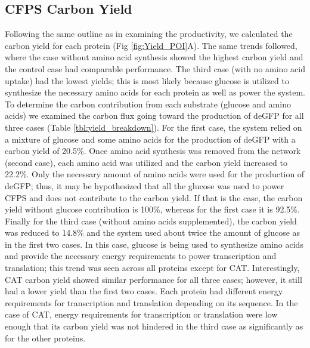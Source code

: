 \documentclass[journal=asbcd6,manuscript=article]{achemso}
\begin{document}
\subsection{CFPS Carbon Yield}
Following the same outline as in examining the productivity, we calculated the carbon yield for each protein (Fig \ref{fig:Yield_POI}A).
The same trends followed, where the case without amino acid synthesis showed the highest carbon yield and the control case had comparable performance.
The third case (with no amino acid uptake) had the lowest yields; this is most likely because glucose is utilized to synthesize the necessary amino acids for each protein as well as power the system. 
To determine the carbon contribution from each substrate (glucose and amino acids) we examined the carbon flux going toward the production of deGFP for all three cases (Table \ref{tbl:yield_breakdown}).
For the first case, the system relied on a mixture of glucose and some amino acids for the production of deGFP with a carbon yield of 20.5\%.
Once amino acid synthesis was removed from the network (second case), each amino acid was utilized and the carbon yield increased to 22.2\%.
Only the necessary amount of amino acids were used for the production of deGFP; thus, it may be hypothesized that all the glucose was used to power CFPS and does not contribute to the carbon yield.
If that is the case, the carbon yield without glucose contribution is 100\%, whereas for the first case it is 92.5\%.
Finally for the third case (without amino acids supplemented), the carbon yield was reduced to 14.8\% and the system used about twice the amount of glucose as in the first two cases.
In this case, glucose is being used to synthesize amino acids and provide the necessary energy requirements to power transcription and translation; this trend was seen across all proteins except for CAT.
Interestingly, CAT carbon yield showed similar performance for all three cases; however, it still had a lower yield than the first two cases.
Each protein had different energy requirements for transcription and translation depending on its sequence.
In the case of CAT, energy requirements for transcription or translation were low enough that its carbon yield was not hindered in the third case as significantly as for the other proteins.
\end{document}
